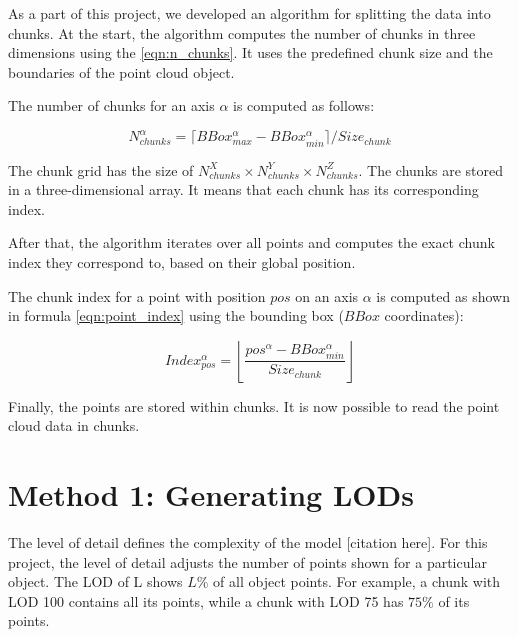 As a part of this project, we developed an algorithm for splitting the data into chunks. At the start, the algorithm computes the number of chunks in three dimensions using the \autoref{eqn:n_chunks}. It uses the predefined chunk size and the boundaries of the point cloud object.

The number of chunks for an axis $\alpha$ is computed as follows:

\begin{equation}
\label{eqn:n_chunks}
N_{chunks}^\alpha = \lceil BBox_{max}^\alpha - BBox_{min}^\alpha \rceil / Size_{chunk}
\end{equation}

The chunk grid has the size of $N_{chunks}^X \times N_{chunks}^Y \times N_{chunks}^Z$. The chunks are stored in a three-dimensional array. It means that each chunk has its corresponding index.

After that, the algorithm iterates over all points and computes the exact chunk index they correspond to, based on their global position.


The chunk index for a point with position $pos$ on an axis $\alpha$ is computed as shown in formula \ref{eqn:point_index} using the bounding box ($BBox$ coordinates):

\begin{equation}
\label{eqn:point_index}
Index_{pos}^\alpha = \left \lfloor \frac{pos^{\alpha} - BBox_{min}^\alpha}{Size_{chunk}} \right \rfloor
\end{equation}

Finally, the points are stored within chunks. It is now possible to read the point cloud data in chunks.


\section{Method 1: Generating LODs}
\label{sec:generating_lods}

The level of detail defines the complexity of the model [citation here]. For this project, the level of detail adjusts the number of points shown for a particular object.
The LOD of L shows $L\%$ of all object points. For example, a chunk with LOD 100 contains all its points, while a chunk with LOD 75 has $75\%$ of its points.

